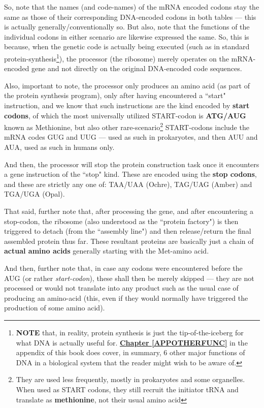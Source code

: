 \documentclass[a4paper, 18pt]{book} %
\begin{document}
So, note that the names (and code-names) of the mRNA encoded codons stay the same as those of their corresponding DNA-encoded codons in both tables --- this is actually generally/conventionally so. But also, note that the functions of the individual codons in either scenario are likewise expressed the same. So, this is because, when the genetic code is actually being executed (such as in standard protein-synthesis\footnote{\textbf{NOTE} that, in reality, protein synthesis is just the tip-of-the-iceberg for what DNA is actually useful for. \textbf{\hyperref[APPOTHERFUNC]{Chapter  \ref{APPOTHERFUNC}}} in the appendix of this book does cover, in summary, 6 other major functions of DNA in a biological system that the reader might wish to be aware of.}), the processor (the ribosome) merely operates on the mRNA-encoded gene and not directly on the original DNA-encoded code sequences.

Also, important to note, the processor only produces an amino acid (as part of the protein synthesis program), only after having encountered a ``start" instruction, and we know that such instructions are the kind encoded by \textbf{start codons}, of which the most universally utilized START-codon is \textbf{ATG/AUG} known as Methionine, but also other rare-scenario\footnote{They are used less frequently, mostly in prokaryotes and some organelles. When used as START codons, they still recruit the initiator tRNA and translate as \textbf{methionine}, not their usual amino acid\cite{copilot_dna_assistant}} START-codons include the mRNA codes GUG and UUG --- used as such in prokaryotes, and then AUU and AUA, used as such in humans only. 

And then, the processor will stop the protein construction task once it encounters a gene instruction of the ``stop" kind. These are encoded using the \textbf{stop codons}, and these are strictly any one of: TAA/UAA (Ochre), TAG/UAG (Amber) and TGA/UGA (Opal)\cite{newsmedical2025startcodons}.

That said, further note that, after processing the gene, and after encountering a stop-codon, the ribosome (also understood as the ``protein factory") is then triggered to detach (from the ``assembly line") and then release/return the final assembled protein thus far. These resultant proteins are basically just a chain of \textbf{actual amino acids} generally starting with the Met-amino acid.

And then, further note that, in case any codons were encountered before the AUG (or rather \textit{start-codon}), these shall then be merely skipped --- they are not processed or would not translate into any product such as the usual case of producing an amino-acid (this, even if they would normally have triggered the production of some amino acid). 
\end{document}
